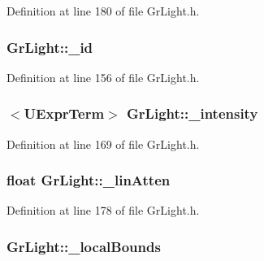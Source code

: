 Definition at line 180 of file GrLight.h.\hypertarget{class_gr_light_e62c43ff3876520d58328957f42d617b}{
\subsubsection[{\_\-id}]{ {\bf GrLight::\_\-id}}}
\label{class_gr_light_e62c43ff3876520d58328957f42d617b}




Definition at line 156 of file GrLight.h.\hypertarget{class_gr_light_17a6414681ade62467624a3149c3b499}{
\subsubsection[{\_\-intensity}]{$<${\bf UExprTerm}$>$ {\bf GrLight::\_\-intensity}}}
\label{class_gr_light_17a6414681ade62467624a3149c3b499}




Definition at line 169 of file GrLight.h.\hypertarget{class_gr_light_27da8da902b606390ff4317d4b99aac0}{
\subsubsection[{\_\-linAtten}]{\setlength{\rightskip}{0pt plus 5cm}float {\bf GrLight::\_\-linAtten}}}
\label{class_gr_light_27da8da902b606390ff4317d4b99aac0}




Definition at line 178 of file GrLight.h.\hypertarget{class_gr_light_b36a7430015dff850df027736b1bc01c}{
\subsubsection[{\_\-localBounds}]{ {\bf GrLight::\_\-localBounds}}}
\label{class_gr_light_b36a7430015dff850df027736b1bc01c}




